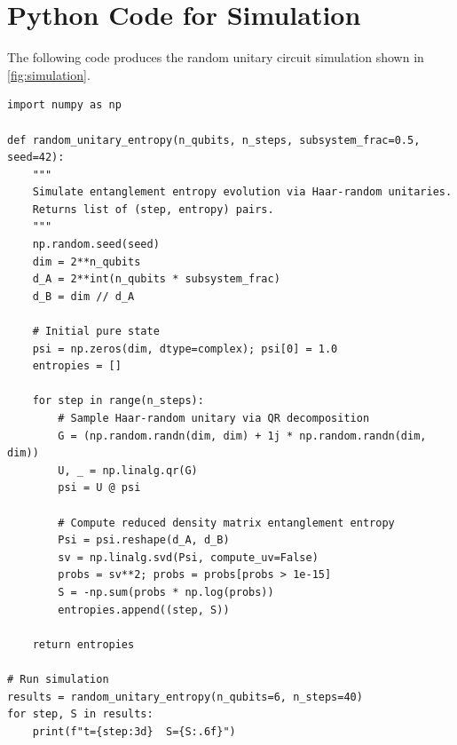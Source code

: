 \documentclass[12pt,a4paper]{article}
\begin{document}
\section{Python Code for Simulation}
\label{app:python}

The following code produces the random unitary circuit simulation
shown in \cref{fig:simulation}.

\begin{verbatim}
import numpy as np

def random_unitary_entropy(n_qubits, n_steps, subsystem_frac=0.5, seed=42):
    """
    Simulate entanglement entropy evolution via Haar-random unitaries.
    Returns list of (step, entropy) pairs.
    """
    np.random.seed(seed)
    dim = 2**n_qubits
    d_A = 2**int(n_qubits * subsystem_frac)
    d_B = dim // d_A

    # Initial pure state
    psi = np.zeros(dim, dtype=complex); psi[0] = 1.0
    entropies = []

    for step in range(n_steps):
        # Sample Haar-random unitary via QR decomposition
        G = (np.random.randn(dim, dim) + 1j * np.random.randn(dim, dim))
        U, _ = np.linalg.qr(G)
        psi = U @ psi

        # Compute reduced density matrix entanglement entropy
        Psi = psi.reshape(d_A, d_B)
        sv = np.linalg.svd(Psi, compute_uv=False)
        probs = sv**2; probs = probs[probs > 1e-15]
        S = -np.sum(probs * np.log(probs))
        entropies.append((step, S))

    return entropies

# Run simulation
results = random_unitary_entropy(n_qubits=6, n_steps=40)
for step, S in results:
    print(f"t={step:3d}  S={S:.6f}")
\end{verbatim}
\end{document}
